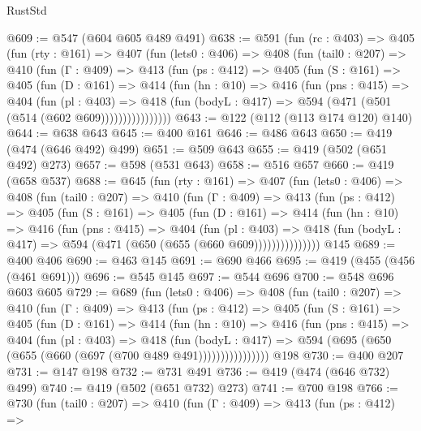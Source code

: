 \begin{lexlean}{RustStd}
\begin{coremodule}
@609 := @547 (@604 @605 @489 @491)
@638 := @591
    (fun (rc : @403) =>
    @405
      (fun (rty : @161) =>
      @407
        (fun (lets0 : @406) =>
        @408
          (fun (tail0 : @207) =>
          @410
            (fun (Γ : @409) =>
            @413
              (fun (ps : @412) =>
              @405
                (fun (S : @161) =>
                @405
                  (fun (D : @161) =>
                  @414
                    (fun (hn : @10) =>
                    @416
                      (fun (pns : @415) =>
                      @404
                        (fun (pl : @403) =>
                        @418
                          (fun (bodyL : @417) => @594 (@471 (@501 (@514 (@602 @609))))))))))))))))
@643 := @122 (@112 (@113 @174 @120) @140)
@644 := @638 @643
@645 := @400 @161
@646 := @486 @643
@650 := @419 (@474 (@646 @492) @499)
@651 := @509 @643
@655 := @419 (@502 (@651 @492) @273)
@657 := @598 (@531 @643)
@658 := @516 @657
@660 := @419 (@658 @537)
@688 := @645
    (fun (rty : @161) =>
    @407
      (fun (lets0 : @406) =>
      @408
        (fun (tail0 : @207) =>
        @410
          (fun (Γ : @409) =>
          @413
            (fun (ps : @412) =>
            @405
              (fun (S : @161) =>
              @405
                (fun (D : @161) =>
                @414
                  (fun (hn : @10) =>
                  @416
                    (fun (pns : @415) =>
                    @404
                      (fun (pl : @403) =>
                      @418 (fun (bodyL : @417) => @594 (@471 (@650 (@655 (@660 @609)))))))))))))))
    @145
@689 := @400 @406
@690 := @463 @145
@691 := @690 @466
@695 := @419 (@455 (@456 (@461 @691)))
@696 := @545 @145
@697 := @544 @696
@700 := @548 @696 @603 @605
@729 := @689
    (fun (lets0 : @406) =>
    @408
      (fun (tail0 : @207) =>
      @410
        (fun (Γ : @409) =>
        @413
          (fun (ps : @412) =>
          @405
            (fun (S : @161) =>
            @405
              (fun (D : @161) =>
              @414
                (fun (hn : @10) =>
                @416
                  (fun (pns : @415) =>
                  @404
                    (fun (pl : @403) =>
                    @418
                      (fun (bodyL : @417) =>
                      @594 (@695 (@650 (@655 (@660 (@697 (@700 @489 @491))))))))))))))))
    @198
@730 := @400 @207
@731 := @147 @198
@732 := @731 @491
@736 := @419 (@474 (@646 @732) @499)
@740 := @419 (@502 (@651 @732) @273)
@741 := @700 @198
@766 := @730
    (fun (tail0 : @207) =>
    @410
      (fun (Γ : @409) =>
      @413
        (fun (ps : @412) =>

\end{coremodule}
\end{lexlean}

